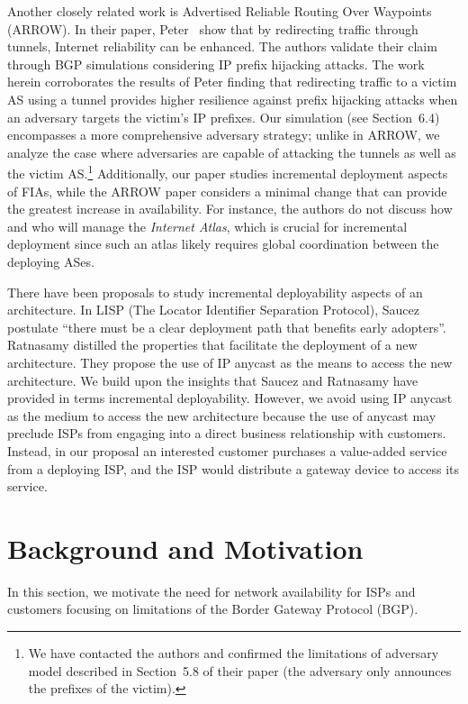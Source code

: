 Another closely related work is Advertised Reliable Routing Over Waypoints
(ARROW). In their paper, Peter~\etal\cite{DBLP:conf/sigcomm/PeterJZWAK14} show
that by redirecting traffic through tunnels, Internet reliability can be
enhanced. The authors validate their claim through BGP simulations considering
IP prefix hijacking attacks. The work herein corroborates the results of Peter
\etal finding that redirecting traffic to a victim AS using a tunnel provides
higher resilience against prefix hijacking attacks when an adversary targets
the victim's IP prefixes. Our simulation (see Section~6.4) encompasses a more
comprehensive adversary strategy; unlike in ARROW, we analyze the case where
adversaries are capable of attacking the tunnels as well as the victim
AS.\footnote{We have contacted the authors and confirmed the limitations of
adversary model described in Section~5.8 of their paper (\ie the adversary only
announces the prefixes of the victim).}  Additionally, our paper studies
incremental deployment aspects of FIAs, while the ARROW paper considers a
minimal change that can provide the greatest increase in availability. For
instance, the authors do not discuss how and who will manage the
\textit{Internet Atlas}, which is crucial for incremental deployment since such
an atlas likely requires global coordination between the deploying ASes.

There have been proposals to study incremental deployability aspects of an
architecture. In LISP (The Locator Identifier Separation Protocol), Saucez
\etal\cite{LISPDeployment2012} postulate ``there must be a clear deployment
path that benefits early adopters''.  Ratnasamy \etal\cite{Evolvable2005}
distilled the properties that facilitate the deployment of a new architecture.
They propose the use of IP anycast as the means to access the new architecture.
We build upon the insights that Saucez \etal and Ratnasamy \etal have provided
in terms  incremental deployability. However, we avoid using IP anycast as the
medium to access the new architecture because the use of anycast may preclude
ISPs from engaging into a direct business relationship with customers. Instead,
in our proposal an interested customer purchases a value-added service from a
deploying ISP, and the ISP would distribute a gateway device to access its
service.

\section{Background and Motivation}
\label{sec:background}
In this section, we motivate the need for network availability for ISPs and
customers focusing on limitations of the Border Gateway Protocol (BGP). 


